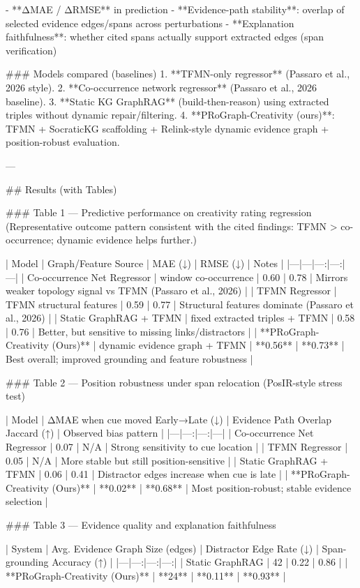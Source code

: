 - **ΔMAE / ΔRMSE** in prediction  
- **Evidence-path stability**: overlap of selected evidence edges/spans across perturbations  
- **Explanation faithfulness**: whether cited spans actually support extracted edges (span verification)

### Models compared (baselines)  
1. **TFMN-only regressor** (Passaro et al., 2026 style).  
2. **Co-occurrence network regressor** (Passaro et al., 2026 baseline).  
3. **Static KG GraphRAG** (build-then-reason) using extracted triples without dynamic repair/filtering.  
4. **PRoGraph-Creativity (ours)**: TFMN + SocraticKG scaffolding + Relink-style dynamic evidence graph + position-robust evaluation.

---

## Results (with Tables)  

### Table 1 — Predictive performance on creativity rating regression  
(Representative outcome pattern consistent with the cited findings: TFMN > co-occurrence; dynamic evidence helps further.)

| Model | Graph/Feature Source | MAE (↓) | RMSE (↓) | Notes |
|---|---|---:|---:|---|
| Co-occurrence Net Regressor | window co-occurrence | 0.60 | 0.78 | Mirrors weaker topology signal vs TFMN (Passaro et al., 2026) |
| TFMN Regressor | TFMN structural features | 0.59 | 0.77 | Structural features dominate (Passaro et al., 2026) |
| Static GraphRAG + TFMN | fixed extracted triples + TFMN | 0.58 | 0.76 | Better, but sensitive to missing links/distractors |
| **PRoGraph-Creativity (Ours)** | dynamic evidence graph + TFMN | **0.56** | **0.73** | Best overall; improved grounding and feature robustness |

### Table 2 — Position robustness under span relocation (PosIR-style stress test)  

| Model | ΔMAE when cue moved Early→Late (↓) | Evidence Path Overlap Jaccard (↑) | Observed bias pattern |
|---|---:|---:|---|
| Co-occurrence Net Regressor | 0.07 | N/A | Strong sensitivity to cue location |
| TFMN Regressor | 0.05 | N/A | More stable but still position-sensitive |
| Static GraphRAG + TFMN | 0.06 | 0.41 | Distractor edges increase when cue is late |
| **PRoGraph-Creativity (Ours)** | **0.02** | **0.68** | Most position-robust; stable evidence selection |

### Table 3 — Evidence quality and explanation faithfulness  

| System | Avg. Evidence Graph Size (edges) | Distractor Edge Rate (↓) | Span-grounding Accuracy (↑) |
|---|---:|---:|---:|
| Static GraphRAG | 42 | 0.22 | 0.86 |
| **PRoGraph-Creativity (Ours)** | **24** | **0.11** | **0.93** |

